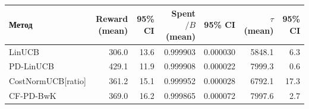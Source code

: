 \begin{tabular}{lrrrrrr}
\toprule
Метод & Reward (mean) & 95\% CI & Spent$/B$ (mean) & 95\% CI & $\tau$ (mean) & 95\% CI \\
\midrule
LinUCB & 306.0 & 13.6 & 0.999903 & 0.000030 & 5848.1 & 6.3 \\
PD-LinUCB & 429.1 & 11.9 & 0.999908 & 0.000022 & 7999.3 & 0.6 \\
CostNormUCB[ratio] & 361.2 & 15.1 & 0.999952 & 0.000028 & 6792.1 & 17.3 \\
CF-PD-BwK & 369.0 & 16.2 & 0.999865 & 0.000072 & 7997.6 & 2.7 \\
\bottomrule
\end{tabular}
